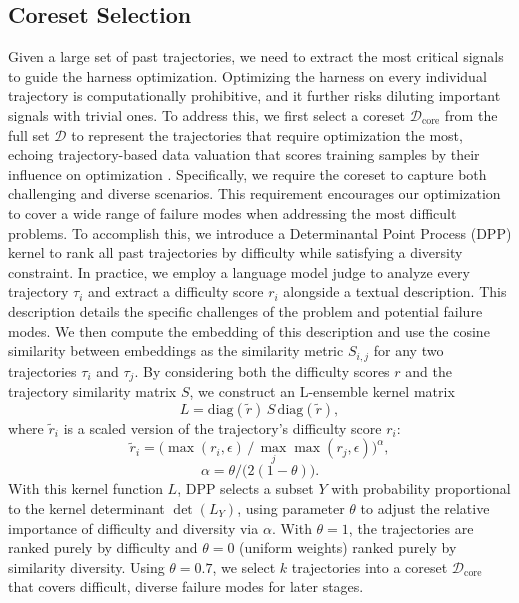 \subsection{Coreset Selection}

Given a large set of past trajectories, we need to extract the most critical signals to guide the harness optimization.
Optimizing the harness on every individual trajectory is computationally prohibitive, and it further risks diluting important signals with trivial ones.
To address this, we first select a coreset $\mathcal{D}_{\mathrm{core}}$ from the full set $\mathcal{D}$ to represent the trajectories that require optimization the most, echoing trajectory-based data valuation that scores training samples by their influence on optimization \citep{xu2025liveval}.
Specifically, we require the coreset to capture both challenging and diverse scenarios.
This requirement encourages our optimization to cover a wide range of failure modes when addressing the most difficult problems.
To accomplish this, we introduce a Determinantal Point Process (DPP) kernel \citep{kulesza2012dpp} to rank all past trajectories by difficulty while satisfying a diversity constraint.
In practice, we employ a language model judge to analyze every trajectory $\tau_i$ and extract a difficulty score $r_i$ alongside a textual description.
This description details the specific challenges of the problem and potential failure modes.
We then compute the embedding of this description and use the cosine similarity between embeddings as the similarity metric $S_{i,j}$ for any two trajectories $\tau_i$ and $\tau_j$.
By considering both the difficulty scores $r$ and the trajectory similarity matrix $S$, we construct an L-ensemble kernel matrix
\[
    L = \mathrm{diag}( \widetilde{r})\,S\,\mathrm{diag}( \widetilde{r}),
\]
where  $\widetilde{r}_i$ is a scaled version of the trajectory's difficulty score $r_i$:
\[
\widetilde{r}_i = \big(\max(r_i,\epsilon)\,/\,\max_j \max(r_j,\epsilon)\big)^{\alpha},
\]
\[
\alpha = \theta/\big(2(1-\theta)\big).
\]
With this kernel function $L$, DPP selects a subset $Y$ with probability proportional to the kernel determinant $\det(L_Y)$, using parameter $\theta$ to adjust the relative importance of difficulty and diversity via $\alpha$. With $\theta = 1$, the trajectories are ranked purely by difficulty and $\theta = 0$ (uniform weights) ranked purely by similarity diversity.
Using $\theta = 0.7$, we select $k$ trajectories into a coreset $\mathcal{D}_{\mathrm{core}}$ that covers difficult, diverse failure modes for later stages.

